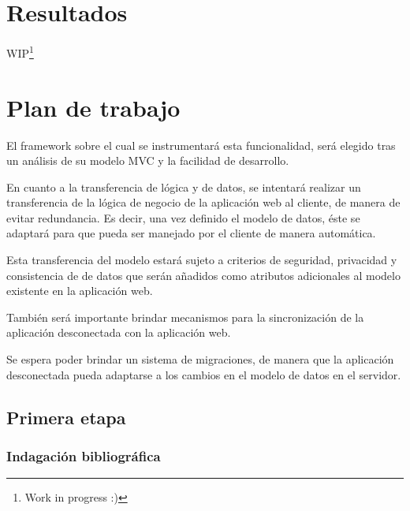 \documentclass[a4paper]{report}
\begin{document}
\chapter{Resultados}
\label{ch:results}
WIP\footnote{Work in progress :)}


\chapter{Plan de trabajo}
\label{ch:milestones}


El framework sobre el cual se instrumentará esta funcionalidad, será elegido tras 
un análisis de su modelo MVC y la facilidad de desarrollo.

En cuanto a la transferencia de lógica y de datos, se intentará realizar un
transferencia de la lógica de negocio de la aplicación web al cliente, 
de manera de evitar redundancia. Es decir, una vez definido el modelo de datos, 
éste se adaptará para que pueda ser manejado por el cliente de manera automática.

Esta transferencia del modelo estará sujeto a criterios de seguridad, privacidad
y consistencia de de datos que serán añadidos como atributos adicionales al 
modelo existente en la aplicación web.

También será importante brindar mecanismos para la sincronización de la
aplicación desconectada con la aplicación web.

Se espera poder brindar un sistema de migraciones, de manera que la aplicación 
desconectada pueda adaptarse a los cambios en el modelo de datos en el servidor.


\section{Primera etapa}
\subsection{Indagación bibliográfica}
\end{document}
